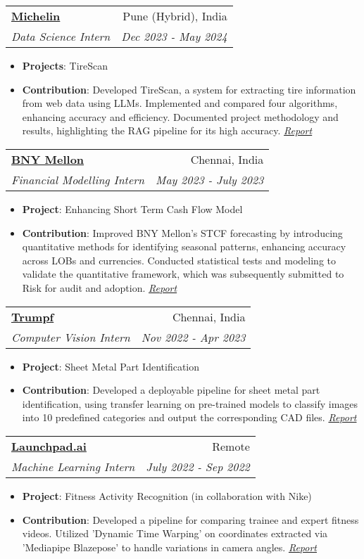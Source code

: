 \documentclass[a4paper,20pt]{article}
\makeatletter
\newcommand{\resumeItem}[2]{
  \item\small{
    \textbf{#1}{: #2 \vspace{-2pt}}
  }
}
\newcommand{\resumeSubheading}[4]{
  \vspace{-1pt}\item
    \begin{tabular*}{0.97\textwidth}{l@{\extracolsep{\fill}}r}
      \textbf{#1} & #2 \\
      \textit{#3} & \textit{#4} \\
    \end{tabular*}\vspace{-5pt}
}
\newcommand{\resumeItemListStart}{\begin{itemize}}
\newcommand{\resumeItemListEnd}{\end{itemize}\vspace{-5pt}}
\makeatother
\begin{document}
    \resumeSubheading{\href{https://www.michelin.in/}{Michelin}}{Pune (Hybrid), India}
    {Data Science Intern}{Dec 2023 - May 2024}
    \resumeItemListStart
      \resumeItem{Projects}
        {TireScan}
      \resumeItem{Contribution}
        {Developed TireScan, a system for extracting tire information from web data using LLMs. Implemented and compared four algorithms, enhancing accuracy and efficiency. Documented project methodology and results, highlighting the RAG pipeline for its high accuracy. \textit{\href{https://github.com/sampadk04/Internship_Projects/blob/main/REPORTS/Michelin/TireScan_Report.pdf}{Report}}}
    \resumeItemListEnd

    \resumeSubheading{\href{https://www.bnymellon.com/}{BNY Mellon}}{Chennai, India}
    {Financial Modelling Intern}{May 2023 - July 2023}
    \resumeItemListStart
        \resumeItem{Project}
          {Enhancing Short Term Cash Flow Model}
        \resumeItem{Contribution}
          {Improved BNY Mellon's STCF forecasting by introducing quantitative methods for identifying seasonal patterns, enhancing accuracy across LOBs and currencies. Conducted statistical tests and modeling to validate the quantitative framework, which was subsequently submitted to Risk for audit and adoption. \textit{\href{https://github.com/sampadk04/Internship_Projects/blob/main/REPORTS/BNY_Mellon/Enhancing_Short_Term_Cashflow-Internship_Report.pdf}{Report}}}
    \resumeItemListEnd

    \resumeSubheading{\href{https://www.trumpf.com/en_IN/}{Trumpf}}{Chennai, India}
    {Computer Vision Intern}{Nov 2022 - Apr 2023}
    \resumeItemListStart
        \resumeItem{Project}
          {Sheet Metal Part Identification}
        \resumeItem{Contribution}
          {Developed a deployable pipeline for sheet metal part identification, using transfer learning on pre-trained models to classify images into 10 predefined categories and output the corresponding CAD files. \textit{\href{https://github.com/sampadk04/Internship_Projects/blob/main/REPORTS/Trumpf_Metamation/Sheet_Metal_Part_Recognition-Internship_Report.pdf}{Report}}}
    \resumeItemListEnd

    \resumeSubheading{\href{https://www.launchpad.ai}{Launchpad.ai}}{Remote}
    {Machine Learning Intern}{July 2022 - Sep 2022}
    \resumeItemListStart
        \resumeItem{Project}
          {Fitness Activity Recognition (in collaboration with Nike)}
        \resumeItem{Contribution}
          {Developed a pipeline for comparing trainee and expert fitness videos. Utilized 'Dynamic Time Warping' on coordinates extracted via 'Mediapipe Blazepose' to handle variations in camera angles. \textit{\href{https://github.com/sampadk04/Internship_Projects/blob/main/REPORTS/Launchpad/Fitness_Activity_Recognition-Final_Report.pdf}{Report}}}
    \resumeItemListEnd
\end{document}

